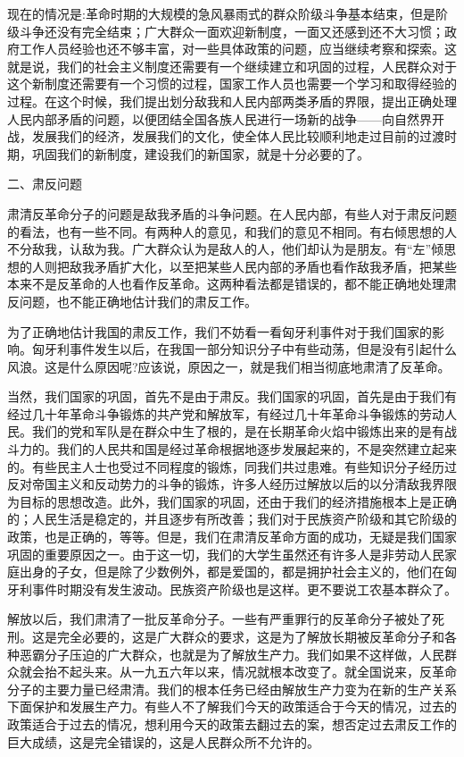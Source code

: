 \documentclass[UTF8, 12pt, a4paper]{ctexrep}
\begin{document}
现在的情况是:革命时期的大规模的急风暴雨式的群众阶级斗争基本结束，但是阶级斗争还没有完全结束；广大群众一面欢迎新制度，一面又还感到还不大习惯；政府工作人员经验也还不够丰富，对一些具体政策的问题，应当继续考察和探索。这就是说，我们的社会主义制度还需要有一个继续建立和巩固的过程，人民群众对于这个新制度还需要有一个习惯的过程，国家工作人员也需要一个学习和取得经验的过程。在这个时候，我们提出划分敌我和人民内部两类矛盾的界限，提出正确处理人民内部矛盾的问题，以便团结全国各族人民进行一场新的战争——向自然界开战，发展我们的经济，发展我们的文化，使全体人民比较顺利地走过目前的过渡时期，巩固我们的新制度，建设我们的新国家，就是十分必要的了。

二、肃反问题

肃清反革命分子的问题是敌我矛盾的斗争问题。在人民内部，有些人对于肃反问题的看法，也有一些不同。有两种人的意见，和我们的意见不相同。有右倾思想的人不分敌我，认敌为我。广大群众认为是敌人的人，他们却认为是朋友。有“左”倾思想的人则把敌我矛盾扩大化，以至把某些人民内部的矛盾也看作敌我矛盾，把某些本来不是反革命的人也看作反革命。这两种看法都是错误的，都不能正确地处理肃反问题，也不能正确地估计我们的肃反工作。

为了正确地估计我国的肃反工作，我们不妨看一看匈牙利事件对于我们国家的影响。匈牙利事件发生以后，在我国一部分知识分子中有些动荡，但是没有引起什么风浪。这是什么原因呢?应该说，原因之一，就是我们相当彻底地肃清了反革命。

当然，我们国家的巩固，首先不是由于肃反。我们国家的巩固，首先是由于我们有经过几十年革命斗争锻炼的共产党和解放军，有经过几十年革命斗争锻炼的劳动人民。我们的党和军队是在群众中生了根的，是在长期革命火焰中锻炼出来的是有战斗力的。我们的人民共和国是经过革命根据地逐步发展起来的，不是突然建立起来的。有些民主人士也受过不同程度的锻炼，同我们共过患难。有些知识分子经历过反对帝国主义和反动势力的斗争的锻炼，许多人经历过解放以后的以分清敌我界限为目标的思想改造。此外，我们国家的巩固，还由于我们的经济措施根本上是正确的；人民生活是稳定的，并且逐步有所改善；我们对于民族资产阶级和其它阶级的政策，也是正确的，等等。但是，我们在肃清反革命方面的成功，无疑是我们国家巩固的重要原因之一。由于这一切，我们的大学生虽然还有许多人是非劳动人民家庭出身的子女，但是除了少数例外，都是爱国的，都是拥护社会主义的，他们在匈牙利事件时期没有发生波动。民族资产阶级也是这样。更不要说工农基本群众了。

解放以后，我们肃清了一批反革命分子。一些有严重罪行的反革命分子被处了死刑。这是完全必要的，这是广大群众的要求，这是为了解放长期被反革命分子和各种恶霸分子压迫的广大群众，也就是为了解放生产力。我们如果不这样做，人民群众就会抬不起头来。从一九五六年以来，情况就根本改变了。就全国说来，反革命分子的主要力量已经肃清。我们的根本任务已经由解放生产力变为在新的生产关系下面保护和发展生产力。有些人不了解我们今天的政策适合于今天的情况，过去的政策适合于过去的情况，想利用今天的政策去翻过去的案，想否定过去肃反工作的巨大成绩，这是完全错误的，这是人民群众所不允许的。
\end{document}
